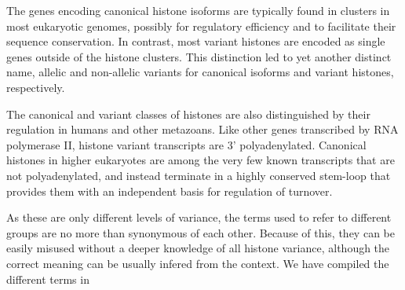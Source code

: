   The genes encoding canonical histone isoforms are typically found in clusters in most eukaryotic
  genomes, possibly for regulatory efficiency and to facilitate their sequence conservation. In
  contrast, most variant histones are encoded as single genes outside of the histone clusters.
  This distinction led to yet another distinct name, allelic and non-allelic variants for
  canonical isoforms and variant histones, respectively.

  The canonical and variant classes of histones are also distinguished by their regulation in humans and other
  metazoans. Like other genes transcribed by RNA polymerase II,  histone variant transcripts
  are 3' polyadenylated. Canonical histones in higher eukaryotes are among the very few known transcripts
  that are not polyadenylated, and instead terminate in a highly conserved stem-loop that
  provides them with an independent basis for regulation of turnover.

  As these are only different levels of variance, the terms used to refer to
  different groups are no more than synonymous of each other. Because of this,
  they can be easily misused without a deeper knowledge of all histone variance,
  although the correct meaning can be usually infered from the context. We
  have compiled the different terms in 


